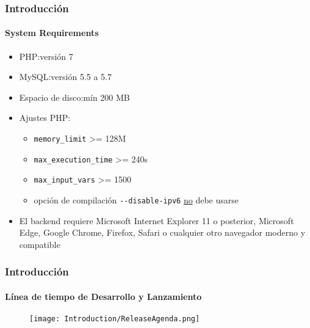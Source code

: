 \begin{frame}[fragile]
	\frametitle{Introducción}
	\framesubtitle{System Requirements}

	\begin{itemize}
		\item PHP:\tabto{2.2cm}versión 7
		\item MySQL:\tabto{2.2cm}versión 5.5 a 5.7
		\item Espacio de disco:\tabto{2.2cm}mín 200 MB
		\item Ajustes PHP:

			\begin{itemize}
				\item \texttt{memory\_limit} >= 128M
				\item \texttt{max\_execution\_time} >= 240s
				\item \texttt{max\_input\_vars} >= 1500
				\item opción de compilación \texttt{-}\texttt{-disable-ipv6} \underline{no} debe usarse
			\end{itemize}

		\item El backend requiere Microsoft Internet Explorer 11 o posterior,
			Microsoft Edge, Google Chrome, Firefox, Safari o cualquier otro navegador
			moderno y compatible

	\end{itemize}

\end{frame}

\begin{frame}[fragile]
	\frametitle{Introducción}
	\framesubtitle{Línea de tiempo de Desarrollo y Lanzamiento}

	\begin{figure}
		\texttt{[image: Introduction/ReleaseAgenda.png]}
	\end{figure}

\end{frame}

